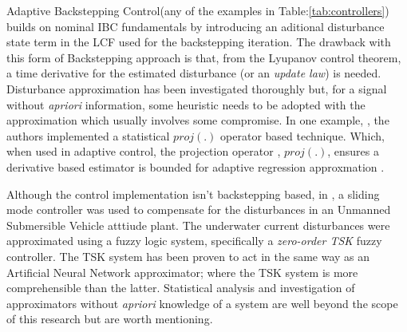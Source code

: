 \par
Adaptive Backstepping Control\cite{backstepping}(any of the examples in Table:\ref{tab:controllers}) builds on nominal IBC fundamentals by introducing an aditional disturbance state term in the LCF used for the backstepping iteration. The drawback with this form of Backstepping approach is that, from the Lyupanov control theorem, a time derivative for the estimated disturbance (or an \emph{update law}) is needed. Disturbance approximation has been investigated thoroughly but, for a signal without \emph{apriori} information, some heuristic needs to be adopted with the approximation which usually involves some compromise.
\newpage
In one example, \cite{nonlinearadaptive}, the authors implemented a statistical $proj(.)$ operator based technique. Which, when used in adaptive control, the projection operator \cite{outputfeedback}, $proj(.)$, ensures a derivative based estimator is bounded for adaptive regression approxmation \cite{nonlinearregression}.
\par
Although the control implementation isn't backstepping based, in \cite{adaptiveslidingmode}, a sliding mode controller was used to compensate for the disturbances in an Unmanned Submersible Vehicle atttiude plant. The underwater current disturbances were approximated using a fuzzy logic system, specifically a \emph{zero-order TSK} fuzzy controller. The TSK system has been proven to act in the same way as an Artificial Neural Network approximator\cite{zeroTSK}; where the TSK system is more comprehensible than the latter. Statistical analysis and investigation of approximators without \emph{apriori} knowledge of a system are well beyond the scope of this research
 but are worth mentioning.
